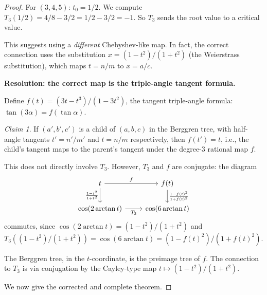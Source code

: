 \documentclass[12pt]{amsart}
\theoremstyle{definition}
\theoremstyle{remark}
\newtheorem{claim}[theorem]{Claim}
\begin{document}
\begin{proof}
For $(3,4,5)$: $t_0 = 1/2$.
We compute $T_3(1/2) = 4/8 - 3/2 = 1/2 - 3/2 = -1$.  So $T_3$ sends
the root value to a critical value.

This suggests using a \emph{different} Chebyshev-like map.  In fact,
the correct connection uses the substitution $x = (1-t^2)/(1+t^2)$
(the Weierstrass substitution), which maps $t=n/m$ to $x=a/c$.

\medskip\noindent\textbf{Resolution: the correct map is the triple-angle
tangent formula.}

Define $f(t) = (3t-t^3)/(1-3t^2)$, the tangent triple-angle formula:
$\tan(3\alpha) = f(\tan\alpha)$.

\begin{claim}\label{claim:f-berggren}
If $(a',b',c')$ is a child of $(a,b,c)$ in the Berggren tree, with
half-angle tangents $t' = n'/m'$ and $t = n/m$ respectively, then
$f(t') = t$, i.e., the child's tangent maps to the parent's tangent
under the degree-3 rational map $f$.
\end{claim}

This does not directly involve $T_3$.  However, $T_3$ and $f$ are
conjugate: the diagram
\[
\begin{tikzcd}
  t \ar[r, "f"] \ar[d, "\frac{1-t^2}{1+t^2}"'] & f(t) \ar[d, "\frac{1-f(t)^2}{1+f(t)^2}"] \\
  \cos(2\arctan t) \ar[r, "T_3"'] & \cos(6\arctan t)
\end{tikzcd}
\]
commutes, since $\cos(2\arctan t) = (1-t^2)/(1+t^2)$ and
$T_3((1-t^2)/(1+t^2)) = \cos(6\arctan t) = (1-f(t)^2)/(1+f(t)^2)$.

The Berggren tree, in the $t$-coordinate, is the preimage tree of $f$.
The connection to $T_3$ is via conjugation by the Cayley-type map
$t\mapsto (1-t^2)/(1+t^2)$.

We now give the corrected and complete theorem.
\end{proof}
\end{document}
